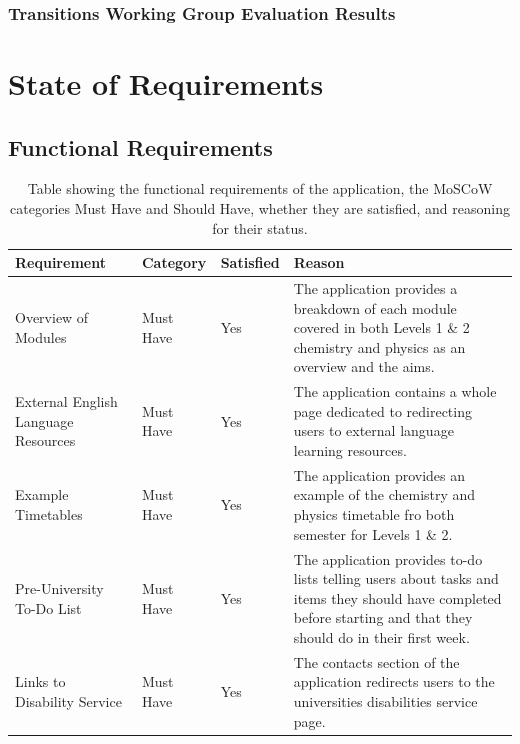 \documentclass{l4proj}
\begin{document}
\begin{appendices}
\subsection{Transitions Working Group Evaluation Results} \label{app:evalTwgResults}


\chapter{State of Requirements} \label{app:reqMet}
\section{Functional Requirements} \label{app:funcMet}
\begin{table}[]
    \caption{Table showing the functional requirements of the application,  the MoSCoW categories Must Have and Should Have,  whether they are satisfied,  and reasoning for their status. }\label{tab:functionalApp}
    \begin{tabular}{ m{3cm}  m{2cm}  m{1.5cm}  m{17em} }
    \hline
    \textbf{Requirement}    & \textbf{Category}                & \textbf{Satisfied}      & \textbf{Reason}                      \\ %
    \hline
    
    Overview of Modules  &  Must Have              & Yes                 & The application provides a breakdown of each module covered in both Levels 1 \& 2 chemistry and physics as an overview and the aims. \\

    External English Language Resources & Must Have & Yes & The application contains a whole page dedicated to redirecting users to external language learning resources. \\

    Example Timetables & Must Have & Yes & The application provides an example of the chemistry and physics timetable fro both semester for Levels 1 \& 2. \\

    Pre-University To-Do List & Must Have & Yes & The application provides to-do lists telling users about tasks and items they should have completed before starting and that they should do in their first week. \\
    
    Links to Disability Service & Must Have & Yes & The contacts section of the application redirects users to the universities disabilities service page. \\
    

\end{tabular}
\end{table}
\end{appendices}
\end{document}
